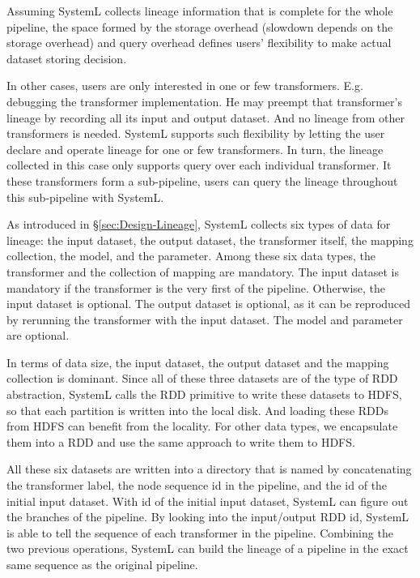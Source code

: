 \documentclass{sig-alternate}
\begin{document}
Assuming SystemL collects lineage information that is complete for the whole pipeline, the space formed by the storage overhead 
(slowdown depends on the storage overhead) and query overhead defines users' flexibility to make actual dataset storing decision.

In other cases, users are only interested in one or few transformers. E.g. debugging the transformer implementation.
He may preempt that transformer's lineage by recording all its input and output dataset. 
And no lineage from other transformers is needed.
SystemL supports such flexibility by letting the user declare and operate lineage for one or few transformers.
In turn, the lineage collected in this case only supports query over each individual transformer.
It these transformers form a sub-pipeline, users can query the lineage throughout this sub-pipeline with SystemL.

As introduced in \S\ref{sec:Design-Lineage}, SystemL collects six types of data for lineage: the input dataset, the output dataset,
the transformer itself, the mapping collection, the model, and the parameter.
Among these six data types, the transformer and the collection of mapping are mandatory. 
The input dataset is mandatory if the transformer is the very first of the pipeline. 
Otherwise, the input dataset is optional.
The output dataset is optional, as it can be reproduced by rerunning the transformer with the input dataset.
The model and parameter are optional.

In terms of data size, the input dataset, the output dataset and the mapping collection is dominant. 
Since all of these three datasets are of the type of RDD abstraction, SystemL calls the RDD primitive to write these datasets
to HDFS, so that each partition is written into the local disk. 
And loading these RDDs from HDFS can benefit from the locality.
For other data types, we encapsulate them into a RDD and use the same approach to write them to HDFS.

All these six datasets are written into a directory that is named by concatenating the transformer label, 
the node sequence id in the pipeline, and the id of the initial input dataset. 
With id of the initial input dataset, SystemL can figure out the branches of the pipeline.
By looking into the input/output RDD id, SystemL is able to tell the sequence of each transformer in the pipeline.
Combining the two previous operations, SystemL can build the lineage of a pipeline in the exact same sequence
as the original pipeline.
\end{document}
